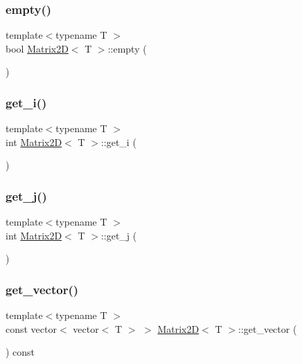 \subsubsection{\texorpdfstring{empty()}{empty()}}
{\footnotesize\ttfamily template$<$typename T $>$ \\
bool \mbox{\hyperlink{classMatrix2D}{Matrix2D}}$<$ T $>$\+::empty (\begin{DoxyParamCaption}{ }\end{DoxyParamCaption})}

\mbox{\label{classMatrix2D_a9d44e60eef0274c20ed9bd1f597c89eb_a9d44e60eef0274c20ed9bd1f597c89eb}} 
\subsubsection{\texorpdfstring{get\+\_\+i()}{get\_i()}}
{\footnotesize\ttfamily template$<$typename T $>$ \\
int \mbox{\hyperlink{classMatrix2D}{Matrix2D}}$<$ T $>$\+::get\+\_\+i (\begin{DoxyParamCaption}{ }\end{DoxyParamCaption})}

\mbox{\label{classMatrix2D_a30918dfce713408a9b3188bea33dbb57_a30918dfce713408a9b3188bea33dbb57}} 
\subsubsection{\texorpdfstring{get\+\_\+j()}{get\_j()}}
{\footnotesize\ttfamily template$<$typename T $>$ \\
int \mbox{\hyperlink{classMatrix2D}{Matrix2D}}$<$ T $>$\+::get\+\_\+j (\begin{DoxyParamCaption}{ }\end{DoxyParamCaption})}

\mbox{\label{classMatrix2D_a2cd319270ca890e47dad636b9af34a11_a2cd319270ca890e47dad636b9af34a11}} 
\subsubsection{\texorpdfstring{get\+\_\+vector()}{get\_vector()}}
{\footnotesize\ttfamily template$<$typename T $>$ \\
const vector$<$ vector$<$ T $>$ $>$ \mbox{\hyperlink{classMatrix2D}{Matrix2D}}$<$ T $>$\+::get\+\_\+vector (\begin{DoxyParamCaption}{ }\end{DoxyParamCaption}) const}

